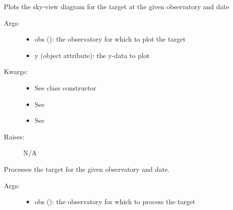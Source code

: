 \documentclass[letterpaper,10pt,english]{sphinxmanual}
\begin{document}
\begin{fulllineitems}
\begin{fulllineitems}
\end{fulllineitems}


\begin{fulllineitems}
\label{astroobs:astroobs.Target.Target.polar}
Plots the sky-view diagram for the target at the given observatory and date
\begin{description}
\item[{Args:}] \leavevmode\begin{itemize}
\item {} 
obs (): the observatory for which to plot the target

\item {} 
y (object attribute): the y-data to plot

\end{itemize}

\item[{Kwargs:}] \leavevmode\begin{itemize}
\item {} 
See class constructor

\item {} 
See 

\item {} 
See 

\end{itemize}

\item[{Raises:}] \leavevmode
N/A

\end{description}

\end{fulllineitems}


\begin{fulllineitems}
\label{astroobs:astroobs.Target.Target.process}
Processes the target for the given observatory and date.
\begin{description}
\item[{Args:}] \leavevmode\begin{itemize}
\item {} 
obs (): the observatory for which to process the target


\end{itemize}
\end{description}
\end{fulllineitems}
\end{fulllineitems}
\end{document}
